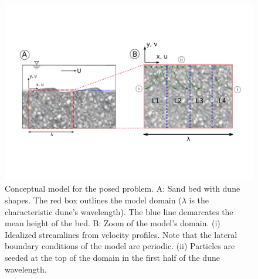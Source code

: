 \documentclass[draft,linenumbers]{agujournal2018}
\begin{document}
\begin{figure}[ht]
\centering
\includegraphics[trim=0.2cm 0.2cm 0.2cm 0.2cm, width=35pc]
{190212_Conceptual.pdf}
\caption{Conceptual model for the posed problem. A: Sand bed with dune shapes. The red box outlines the model domain ($\lambda$ is the characteristic dune's wavelength). The blue line demarcates the mean height of the bed. B: Zoom of the model's domain. (i) Idealized streamlines from velocity profiles. Note that the lateral boundary conditions of the model are periodic. (ii) Particles are seeded at the top of the domain in the first half of the dune wavelength.}
\label{Conceptual}
\end{figure}
\end{document}
